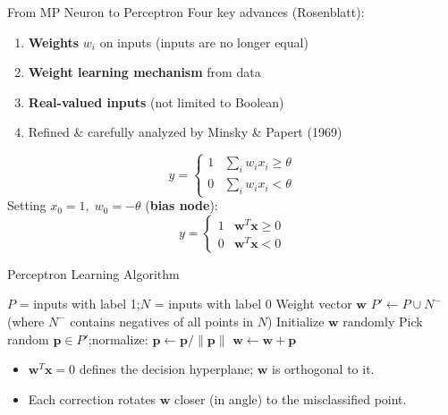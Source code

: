 \documentclass{beamer}
\begin{document}
\begin{frame}{From MP Neuron to Perceptron}
  Four key advances (Rosenblatt):
  \begin{enumerate}
    \item \textbf{Weights} $w_i$ on inputs (inputs are no longer equal)
    \item \textbf{Weight learning mechanism} from data
    \item \textbf{Real-valued inputs} (not limited to Boolean)
    \item Refined \& carefully analyzed by Minsky \& Papert (1969)
  \end{enumerate}
  \vspace{0.3cm}
  \[
    y = \begin{cases} 1 & \sum_i w_i x_i \geq \theta \\ 0 & \sum_i w_i x_i < \theta \end{cases}
  \]
  Setting $x_0 = 1,\; w_0 = -\theta$ (\textbf{bias node}):
  \[
    y = \begin{cases} 1 & \mathbf{w}^T\mathbf{x} \geq 0 \\ 0 & \mathbf{w}^T\mathbf{x} < 0 \end{cases}
  \]
\end{frame}

\begin{frame}{Perceptron Learning Algorithm}
  \begin{algorithm}[H]
  \begin{algorithmic}[1]
    \REQUIRE $P$ = inputs with label 1;\quad $N$ = inputs with label 0
    \ENSURE Weight vector $\mathbf{w}$
    \STATE $P' \leftarrow P \cup N^{-}$ \quad (where $N^{-}$ contains negatives of all points in $N$)
    \STATE Initialize $\mathbf{w}$ randomly
      \STATE Pick random $\mathbf{p} \in P'$;\quad normalize: $\mathbf{p} \leftarrow \mathbf{p}/\|\mathbf{p}\|$
        \STATE $\mathbf{w} \leftarrow \mathbf{w} + \mathbf{p}$
      \ENDIF
    \ENDWHILE
  \end{algorithmic}
  \caption{Perceptron Learning (normalized)}
  \end{algorithm}
  \vspace{0.2cm}
  \begin{itemize}
    \item $\mathbf{w}^T\mathbf{x} = 0$ defines the decision hyperplane; $\mathbf{w}$ is orthogonal to it.
    \item Each correction rotates $\mathbf{w}$ closer (in angle) to the misclassified point.
  \end{itemize}
\end{frame}
\end{document}
